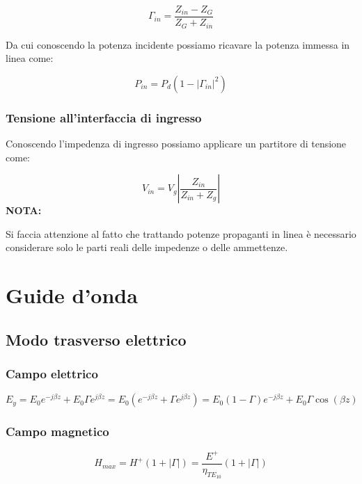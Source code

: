 \documentclass[10pt,a4paper]{report}
\begin{document}
		\begin{equation}
		\Gamma_{in}=\frac{Z_{in}-Z_G}{Z_G+Z_{in}}
		\end{equation}

		Da cui conoscendo la potenza incidente possiamo ricavare la potenza immessa in linea come:

		\begin{equation}
		P_{in}=P_d(1-|\Gamma_{in}|^2)
		\end{equation}

		\subsection{Tensione all'interfaccia di ingresso}

		Conoscendo l'impedenza di ingresso possiamo applicare un partitore di tensione come:

		\begin{equation}
		V_{in}=V_g|\frac{Z_{in}}{Z_{in}+Z_g}|
		\end{equation}
		\textbf{NOTA:}

		Si faccia attenzione al fatto che trattando potenze propaganti in linea è necessario considerare solo le parti reali delle impedenze o delle ammettenze.

\chapter{Guide d'onda}
		
	\section{Modo trasverso elettrico}

		\subsection{Campo elettrico}
				\begin{equation}
				E_y= E_0e^{-j\beta z}+E_0 \Gamma e^{j \beta z}=E_0(e^{-j \beta z}+\Gamma e^{j \beta z}) =E_0(1 - \Gamma)e^{-j \beta z} + E_0 \Gamma \cos(\beta z)
				\end{equation}

		\subsection{Campo magnetico}

				\begin{equation}
				H_{max}=H^+(1+|\Gamma|)=\frac{E^+}{\eta_{TE_{10}}}{(1+|\Gamma|)}
				\end{equation}
\end{document}
